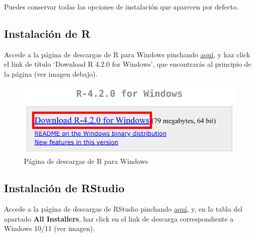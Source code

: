 \documentclass[
  title=normal,
  notoc,
  bib=normal]{mnye}
\begin{document}
Puedes conservar todas las opciones de instalación que aparecen por defecto.

\hypertarget{instalaciuxf3n-de-r-1}{%
\subsection{Instalación de R}\label{instalaciuxf3n-de-r-1}}

Accede a la página de descargas de R para Windows pinchando \href{https://cloud.r-project.org/bin/windows/base/}{aquí}, y haz click el link de título `Download R 4.2.0 for Windows', que encontrarás al principio de la página (ver imagen debajo).

\begin{figure}

{\centering \includegraphics[width=0.65\linewidth]{images/r-windows} 

}

\caption{Página de descargas de R para Windows}\label{fig:unnamed-chunk-12}
\end{figure}

\hypertarget{instalaciuxf3n-de-rstudio-1}{%
\subsection{Instalación de RStudio}\label{instalaciuxf3n-de-rstudio-1}}

Accede a la página de descargas de RStudio pinchando \href{https://rstudio.com/products/rstudio/download/\#download}{aquí}, y, en la tabla del apartado \textbf{All Installers}, haz click en el link de descarga correspondiente a Windows 10/11 (ver imagen).
\end{document}
